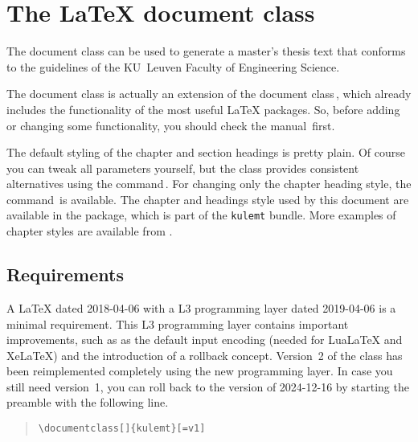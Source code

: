\ExplSyntaxOn
\NewDocumentCommand{}
\ExplSyntaxOff
\newcommand*\optionlabelnote[1]{\hfill \textit{(#1)}}

\chapter{The LaTeX document class }
\label{cha:kulemt}
The document class  can be used to generate a master's thesis text
that conforms to the guidelines of the KU~Leuven Faculty of Engineering
Science.

The document class  is actually an extension of the 
document class\,\cite{pkg:memoir}, which already includes the functionality of
the most useful LaTeX packages. So, before adding or changing some
functionality, you should check the  manual\,\cite{memman} first.

The default styling of the chapter and section headings is pretty plain. Of
course you can tweak all parameters yourself, but the  class
provides consistent alternatives using the 
command\,\cite[section 6.9]{memman}. For changing only the chapter heading
style, the  command\,\cite[section 6.5]{memman} is available.
The chapter and headings style used by this document are available in the
 package, which is part of the \verb"kulemt" bundle. More examples
of chapter styles are available from \cite{memchap}.

\section{Requirements}\label{sec:requirements}
A LaTeX dated 2018-04-06 with a L3 programming layer dated 2019-04-06 is a
minimal requirement. This L3 programming layer contains important improvements,
such as  as the default input encoding (needed for LuaLaTeX and
XeLaTeX) and the introduction of a rollback concept. Version~2 of the
 class has been reimplemented completely using the new programming
layer. In case you still need version~1, you can roll back to the version of
2024-12-16 by starting the preamble with the following line.
\begin{quote}
  \verb"\documentclass["\verb"]{kulemt}[=v1]"
\end{quote}


